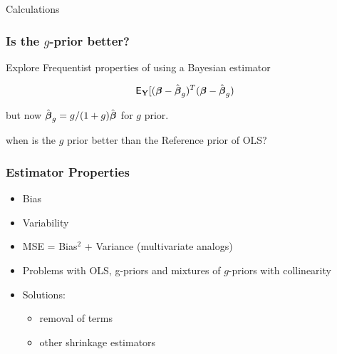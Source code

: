 \documentclass[]{beamer}
\begin{document}
\begin{frame}{Calculations}


  
\end{frame}

\begin{frame}
  \frametitle{Is the $g$-prior better?}
  
Explore Frequentist properties of using a Bayesian estimator

$$\textsf{E}_{\mathbf{Y}}[( \boldsymbol{\beta} - \hat{\boldsymbol{\beta}}_g)^T(\boldsymbol{\beta} -\hat{\boldsymbol{\beta}}_g)$$

but now $\hat{\boldsymbol{\beta}}_g = g/(1+g) \hat{\boldsymbol{\beta}}$ for $g$ prior. \pause

\vfill when is the $g$ prior better than the Reference prior of OLS?
\end{frame}




\begin{frame}\frametitle{Estimator Properties}

  \begin{itemize}
  \item  Bias  \pause
  \item  Variability \pause
  \item MSE = Bias$^2$ + Variance  (multivariate analogs) \pause
\item Problems with OLS, g-priors and mixtures of $g$-priors with collinearity \pause
\item Solutions: \pause
  \begin{itemize}
  \item removal of terms \pause
   \item other shrinkage estimators
  \end{itemize}

  \end{itemize}
\end{frame}
\end{document}
